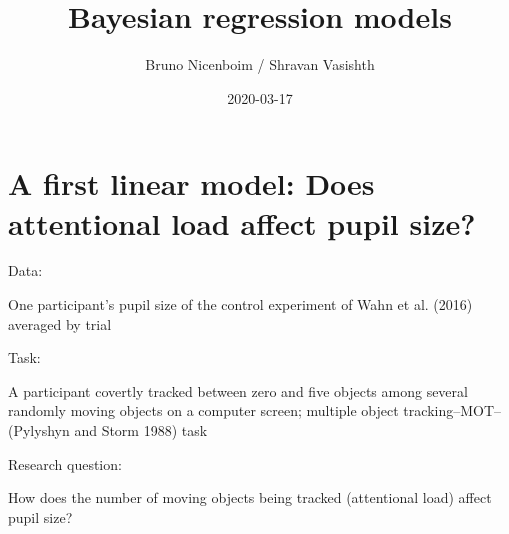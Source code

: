 \documentclass[12pt,ignorenonframetext,aspectratio=169]{beamer}
\title{Bayesian regression models}
\author{Bruno Nicenboim / Shravan Vasishth}
\date{2020-03-17}
\begin{document}
\frame{\titlepage}

\begin{frame}
\tableofcontents[hideallsubsections]
\end{frame}
\hypertarget{sec:pupil}{%
\section{A first linear model: Does attentional load affect pupil size?}\label{sec:pupil}}

\small

\normalsize

\begin{frame}

\begin{block}{Data:}

One participant's pupil size of the control experiment of Wahn et al. (2016) averaged by trial

\end{block}

\begin{block}{Task:}

A participant covertly tracked between zero and five objects among several randomly moving objects on a computer screen; multiple object tracking--MOT-- (Pylyshyn and Storm 1988) task

\end{block}

\begin{block}{Research question:}

How does the number of moving objects being tracked (attentional load) affect pupil size?

\end{block}

\end{frame}
\end{document}
